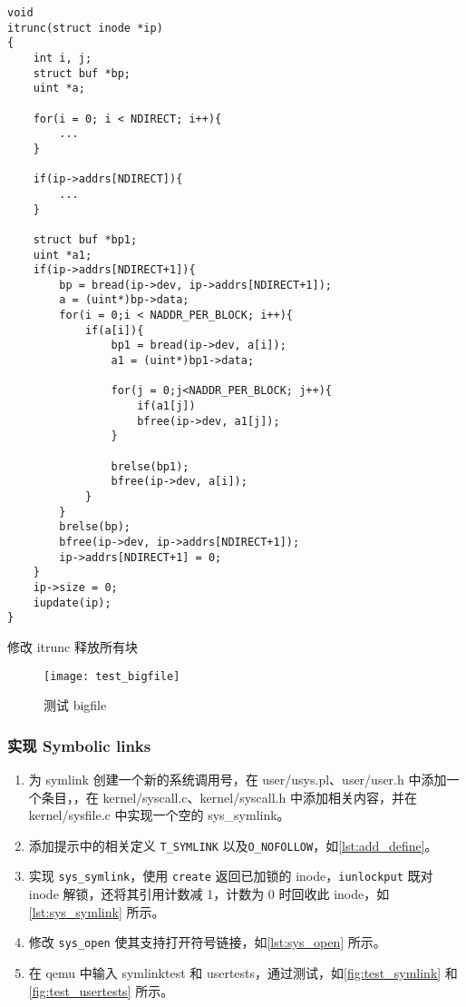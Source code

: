 \begin{listing}[!htb]
	\begin{verbatim}
void
itrunc(struct inode *ip)
{
    int i, j;
    struct buf *bp;
    uint *a;
    
    for(i = 0; i < NDIRECT; i++){
        ...
    }
    
    if(ip->addrs[NDIRECT]){
        ...
    }
    
    struct buf *bp1;
    uint *a1;
    if(ip->addrs[NDIRECT+1]){
        bp = bread(ip->dev, ip->addrs[NDIRECT+1]);
        a = (uint*)bp->data;
        for(i = 0;i < NADDR_PER_BLOCK; i++){
            if(a[i]){
                bp1 = bread(ip->dev, a[i]);
                a1 = (uint*)bp1->data;
                
                for(j = 0;j<NADDR_PER_BLOCK; j++){
                    if(a1[j])
                    bfree(ip->dev, a1[j]);
                }
                
                brelse(bp1);
                bfree(ip->dev, a[i]);
            }
        }
        brelse(bp);
        bfree(ip->dev, ip->addrs[NDIRECT+1]);
        ip->addrs[NDIRECT+1] = 0;
    }
    ip->size = 0;
    iupdate(ip);
}
	\end{verbatim}
	\caption{修改 itrunc 释放所有块}\label{lst:itrunc}
\end{listing}

\begin{figure}[!htb]
	\centering
	\texttt{[image: test\_bigfile]}
	\caption{测试 bigfile}
	\label{fig:test_bigfile}
\end{figure}

\subsubsection{实现 Symbolic links}

\begin{enumerate}
	\item 为 symlink 创建一个新的系统调用号，在 user/usys.pl、user/user.h 中添加一个条目，，在 kernel/syscall.c、kernel/syscall.h 中添加相关内容，并在  kernel/sysfile.c 中实现一个空的 sys\_symlink。
	\item 添加提示中的相关定义 \texttt{T\_SYMLINK} 以及\texttt{O\_NOFOLLOW}，如\cref{lst:add_define}。
	\item 实现 \texttt{sys\_symlink}，使用 \texttt{create} 返回已加锁的 inode，\texttt{iunlockput} 既对 inode 解锁，还将其引用计数减 1，计数为 0 时回收此 inode，如\cref{lst:sys_symlink} 所示。
	\item 修改 \texttt{sys\_open} 使其支持打开符号链接，如\cref{lst:sys_open} 所示。
	\item 在 qemu 中输入 symlinktest 和 usertests，通过测试，如\cref{fig:test_symlink} 和\cref{fig:test_usertests} 所示。
\end{enumerate}

